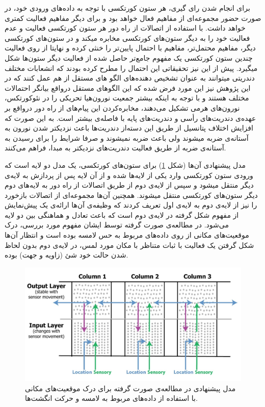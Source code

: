 \documentclass[12pt]{report}
\begin{document}
	برای انجام شدن رای گیری، هر ستون کورتکسی با توجه به داده‌های ورودی خود، در صورت حضور مجموعه‌ای از مفاهیم فعال خواهد بود و برای دیگر مفاهیم فعالیت کمتری خواهد داشت. با استفاده از اتصالات از راه دور هر ستون کورتکسی فعالیت و عدم فعالیت خود را به دیگر ستون‌های کورتکسی مخابره میکند و در ستون‌های کورتکسی دیگر، مفاهیم محتمل‌تر، مفاهیم با احتمال پایین‌تر را خنثی کرده و نهایتا از روی فعالیت چندین ستون کورتکسی یک مفهوم جامع‌تر حاصل شده از فعالیت دیگر ستون‌ها شکل میگیرد. پیش از این نیز تحقیقاتی این احتمال را مطرح کرده بودند که انشعابات مختلف دندریتی میتوانند به عنوان تشخیص دهنده‌های الگو های مستقل از هم عمل کنند \cite{POIRAZI2003989, Polsky2004} که در این پژوهش نیز این مورد فرض شده که این الگو‌های مستقل درواقع بیانگر احتمالات مختلف هستند و با توجه به اینکه بیشتر جمعیت نورون‌هیا تحریکی را در نئوکورتکس، نورون‌های هرمی تشکیل می‌دهند، مخابره‌کردن این پیام‌های از راه دور درواقع بر عهده‌ی دندریت‌های رأسی و دندریت‌های پایه‌ با فاصله‌ی بیشتر است. به این صورت که افزایش اختلاف پتانسیل از طریق این دسته‌از دندریت‌ها باعث نزدیکتر شدن نورون به آستانه‌ی ضربه میشوند ولی باعث ضربه نمیشوند و صرفا شرایط را برای رسیدن به آستانه‌ی ضربه از طریق فعالیت دندریت‌های نزدیکتر به مبدا، فراهم می‌کنند.
	
	مدل پیشنهادی آن‌ها (شکل \ref{fig:hawkins2017}) برای ستون‌های کورتکسی، یک مدل دو لایه‌ است که ورودی ستون کورتکسی وارد یکی از لایه‌ها شده و از آن لایه پس از پردازش به لایه‌ی دیگر منتقل میشود و سپس از لایه‌‌ی دوم از طریق اتصالات از راه دور به لا‌‌یه‌های دوم دیگر ستون‌های کورتکسی منتقل میشوند. همچنین آن‌ها مجموعه‌ای از اتصالات بازخورد را نیز از لایه‌ی دوم به لا‌یه‌ی اول تعریف کردند که وظیفه‌ی آن‌ها ارائه‌ی یک پیش‌نمایش از مفهوم‌ شکل گرفته در لايه‌ی دوم است که باعث تعادل و هماهنگی بین دو لایه‌ می‌شود. در مطالعه‌ی صورت گرفته توسط ایشان\cite{Hawkins2017} مفهوم مورد بررسی، درک موقعیت‌های مکانی از روی داده‌های مربوط به حس لامسه بوده است و انتظار آن‌ها شکل گرفتن یک فعالیت با ثبات متناظر با مکان مورد لمس، در لایه‌ی دوم بدون لحاظ شدن حالت خود شئ (زاویه و جهت) بوده. 
	
	\begin{figure}[H]
		\centering
		\includegraphics[width=1.0\linewidth]{hawkins2017.jpg}
		\caption[NS]{
			مدل پیشنهادی در مطالعه‌ی صورت گرفته \cite{Hawkins2017} برای درک موقعیت‌های مکانی با استفاده از داده‌های مربوط به لامسه و حرکت انگشت‌ها.
		}
		\label{fig:hawkins2017} 
	\end{figure}
\end{document}

